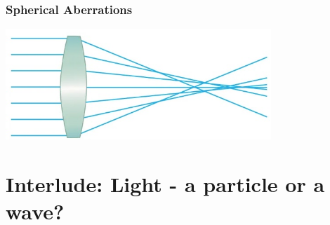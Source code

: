 \documentclass{beamer}
\begin{document}
\begin{frame}\frametitle{Spherical Aberrations}

\begin{center}
\includegraphics[width=10cm]{fig/sphereAbb.jpg}
\end{center}

\end{frame}



\section{Interlude: Light - a particle or a wave?}
\end{document}
